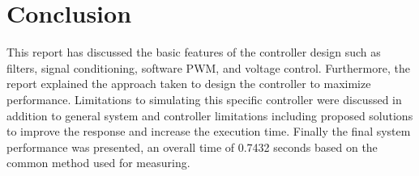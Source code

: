 \section{Conclusion}
\label{sec:Conclusion}

This report has discussed the basic features of the controller design such as filters, signal conditioning, software PWM, and voltage control. 
Furthermore, the report explained the approach taken to design the controller to maximize performance. 
Limitations to simulating this specific controller were discussed in addition to general system and controller limitations including proposed solutions to improve the response and increase the execution time. 
Finally the final system performance was presented, an overall time of 0.7432 seconds based on the common method used for measuring.